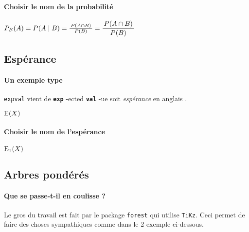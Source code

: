 \documentclass[12pt,a4paper]{article}
\theoremstyle{definition}
\newcommand\whyprefix[2]{%
	\textbf{\prefix{#1}}-#2%
}
\newcommand\prefix[1]{%
	\texttt{#1}%
}
\newcommand\inenglish[1]{%
	\emph{\og #1 \fg} en anglais%
}
\begin{document}


\paragraph{Choisir le nom de la probabilité}

\begin{latexex}
$\probacond[P]{B}{A}
 =
 \probacond*[P]{B}{A}
 =
 \probacond**[P]{B}{A}
 =
 \dprobacond**[P]{B}{A}$
\end{latexex}




\subsection{Espérance}

\paragraph{Un exemple type}

\prefix{expval} vient de \whyprefix{exp}{ected} \whyprefix{val}{ue} soit \inenglish{espérance}.
\begin{latexex}
$\expval{X}$
\end{latexex}




\paragraph{Choisir le nom de l'espérance}

\begin{latexex}
$\expval[E_1]{X}$
\end{latexex}



\subsection{Arbres pondérés}

\paragraph{Que se passe-t-il en coulisse ?}

Le gros du travail est fait par le package \verb+forest+ qui utilise \verb+TiKz+. Ceci permet de faire des choses sympathiques comme dans le 2\ieme{} exemple ci-dessous.
\end{document}
